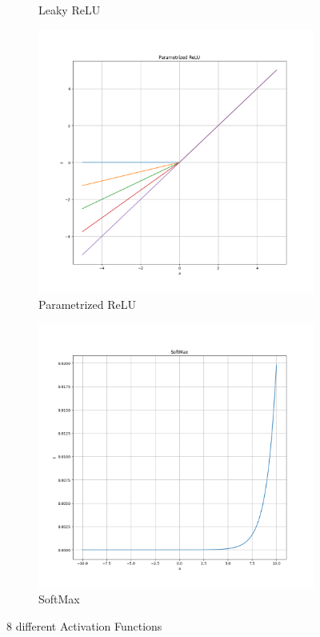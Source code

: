 \begin{figure}
\begin{subfigure}{0.24\linewidth}
		\caption{Leaky ReLU}
	\end{subfigure}
	\begin{subfigure}{0.24\linewidth}
		\includegraphics[width=\linewidth]{figures/pararelu.png}
		\caption{Parametrized ReLU}
	\end{subfigure}
	\begin{subfigure}{0.24\linewidth}
		\includegraphics[width=\linewidth]{figures/softmax.png}
		\caption{SoftMax}
	\end{subfigure}
	\caption{8 different Activation Functions}
	\label{fig:act}
\end{figure}
